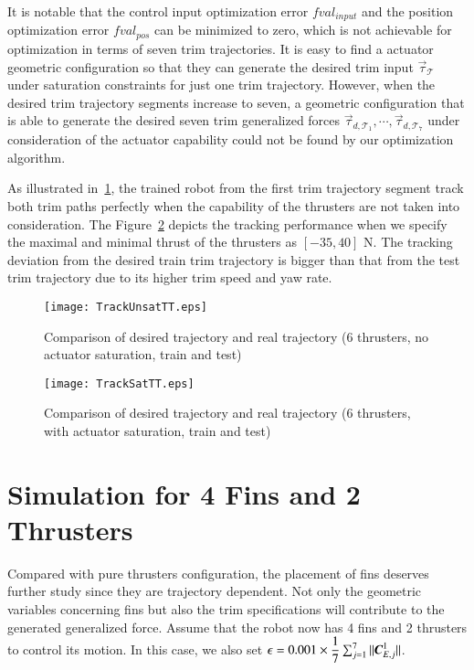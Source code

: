 \newpage
It is notable that the control input optimization error $fval_{input}$ and the position optimization error $fval_{pos}$ can be minimized to zero, which is not achievable for optimization in terms of seven trim trajectories. It is easy to find a actuator geometric configuration so that they can generate the desired trim input $\vec{\tau}_{\mathcal{T}}$ under saturation constraints for just one trim trajectory. However, when the desired trim trajectory segments increase to seven, 
a geometric configuration that is able to generate the desired seven trim generalized forces $\vec{\tau}_{d,\mathcal{T}_{1}}, \cdots, \vec{\tau}_{d,\mathcal{T}_{7}}$ under consideration of the actuator capability could not be found by our optimization algorithm.





\newpage

As illustrated in~\ref{FIG:TrackUnsatTT}, the trained robot from the first trim trajectory segment track both trim paths perfectly when the capability of the thrusters are not taken into consideration. The Figure~\ref{FIG:TrackSatTT} depicts the tracking performance when we specify the maximal and minimal thrust of the thrusters as $[-35,40]$ N. The tracking deviation from the desired train trim trajectory is bigger than that from the test trim trajectory due to its higher trim speed and yaw rate.

\begin{figure}
\centering
\texttt{[image: TrackUnsatTT.eps]}
\caption{Comparison of desired trajectory and real trajectory (6 thrusters, no actuator saturation, train and test)}	
\label{FIG:TrackUnsatTT}
\end{figure}
\begin{figure}[h]
\texttt{[image: TrackSatTT.eps]}
\caption{Comparison of desired trajectory and real trajectory (6 thrusters, with actuator saturation, train and test)}	
\label{FIG:TrackSatTT}
\end{figure}
\section{Simulation for 4 Fins and 2 Thrusters} 
Compared with pure thrusters configuration, the placement of fins deserves further study since they are trajectory dependent. Not only the geometric variables concerning fins but also the trim specifications will contribute to the generated generalized force. Assume that the robot now has 4 fins and 2 thrusters to control its motion. In this case, we also set $\epsilon=0.001\times\dfrac{1}{7}\sum_{j=1}^{7}||\emph{\textbf{C}}_{E,j}^{1}||$.

